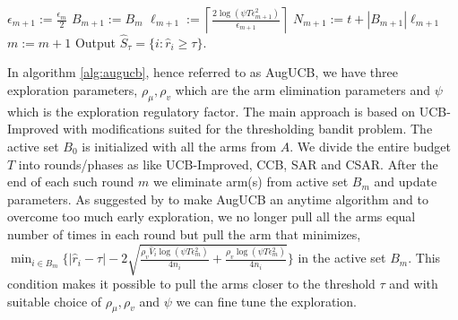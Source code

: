 \begin{algorithm}[th!]
\begin{algorithmic}
\begin{align*}
\end{align*}
\EndArmElimV
\State {}
\ResetParam
\State $\epsilon_{m+1}:=\frac{\epsilon_{m}}{2}$
\State $B_{m+1} := B_{m}$
\State $\ell_{m+1}:=\left\lceil \frac{2\log(\psi T\epsilon_{m+1}^{2})}{\epsilon_{m+1}} \right\rceil$
\State $N_{m+1} := t + |B_{m+1}|\ell_{m+1}$
\State $m := m+1$
\EndResetParam
\EndIf
\EndFor
\State Output $\hat{S}_{\tau}=\lbrace i: \hat{r}_{i}\geq \tau \rbrace$.
\end{algorithmic}
\end{algorithm}



In algorithm \ref{alg:augucb}, hence referred to as AugUCB, we have three exploration parameters, $\rho_{\mu}, \rho_v$ which are the arm elimination parameters and $\psi$ which is the exploration regulatory factor. The main approach is based on UCB-Improved with modifications suited for the thresholding bandit problem. The active set $B_{0}$ is initialized with all the arms from $A$. We divide the entire budget $T$ into rounds/phases as like UCB-Improved, CCB, SAR and CSAR. After the end of each such round $m$ we eliminate arm(s) from active set $B_{m}$ and update parameters. As suggested by \cite{liu2016modification} to make AugUCB an anytime algorithm and to overcome too much early exploration, we no longer pull all the arms equal number of times in each round but pull the arm that minimizes,  
$\min_{i\in B_{m}}\big\lbrace |\hat{r}_{i} - \tau | - 2\sqrt{\frac{\rho_v \hat{V}_{i} \log (\psi T \epsilon_{m}^{2})}{4 n_{i}} + \frac{\rho_v \log{(\psi T\epsilon_{m}^{2})}}{4 n_{i}}} \big\rbrace $
in the active set $B_{m}$. This condition makes it possible to pull the arms closer to the threshold $\tau$ and with suitable choice of $\rho_{\mu},\rho_v$ and $\psi$ we can fine tune the exploration. 
